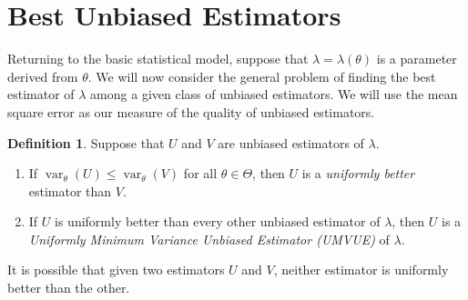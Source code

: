 \documentclass[a4paper,12pt]{article}
\theoremstyle{definition}
\theoremstyle{definition}
\theoremstyle{definition}
\newtheorem{definition}{Definition}[section]
\newcommand{\var}{\operatorname{var}}
\begin{document}
\section{Best Unbiased Estimators}
    Returning to the basic statistical model, suppose that $\lambda = \lambda(\theta)$ is a parameter derived from $\theta$. We will now consider the general problem of finding the best estimator of $\lambda$ among a given class of unbiased estimators. We will use the mean square error as our measure of the quality of unbiased estimators.
    \begin{definition}
        Suppose that $U$ and $V$ are unbiased estimators of $\lambda$.
        \begin{enumerate}[label=\alph*.]
            \item
                If $\var_\theta(U) \leq \var_\theta(V)$ for all $\theta \in \Theta$, then $U$ is a \textit{uniformly better} estimator than $V$.
            \item
                If $U$ is uniformly better than every other unbiased estimator of $\lambda$, then $U$ is a \textit{Uniformly Minimum Variance Unbiased Estimator (UMVUE)} of $\lambda$.
        \end{enumerate}
    \end{definition}
    It is possible that given two estimators $U$ and $V$, neither estimator is uniformly better than the other. \par
\end{document}
